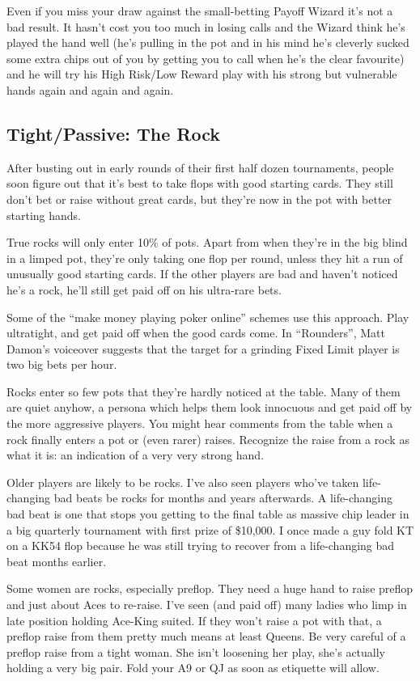 Even if you miss your draw against the small-betting Payoff Wizard
it's not a bad result. It hasn't cost you too much in losing calls and
the Wizard think he's played the hand well (he's pulling in the pot and
in his mind he's cleverly sucked some extra chips out of you by
getting you to call when he's the clear favourite)
and he will try his High Risk/Low Reward play with his strong but
vulnerable hands again and again and again.

\subsection{Tight/Passive: The Rock}

After busting out in early rounds of their first half dozen
tournaments, people soon figure out that it's best to take flops
with good starting cards. They still don't bet or raise without
great cards, but they're now in the pot with better starting hands.

True rocks will only enter 10\% of pots. Apart from when they're
in the big blind in a limped pot, they're only taking one
flop per round, unless they hit a run of unusually good starting
cards. If the other players are bad and haven't noticed
he's a rock, he'll still get paid off on his ultra-rare bets.

Some of the ``make money playing poker online'' schemes use this
approach. Play ultratight, and get paid off when the good cards
come. In ``Rounders'', Matt Damon's voiceover suggests that
the target for a grinding Fixed Limit player is two big bets per
hour.

Rocks enter so few pots that they're hardly noticed
at the table. Many of them are quiet anyhow,
a persona which helps them look innocuous and get paid off by the
more aggressive players. You might hear comments from the table
when a rock finally enters a pot or (even rarer) raises. Recognize
the raise from a rock as what it is: an indication of a very very
strong hand.

Older players are likely to be rocks. I've also seen players who've
taken life-changing bad beats be rocks for months and years
afterwards. A life-changing bad beat is one that stops you getting to
the final table as massive chip leader in a big quarterly tournament
with first prize of \$10,000. I once made a guy fold KT on a KK54 flop
because he was still trying to recover from a life-changing bad beat
months earlier.

Some women are rocks, especially preflop. They
need a huge hand to raise preflop and just about Aces to
re-raise. I've seen (and paid off) many ladies who limp in late
position holding Ace-King suited. If they won't raise a pot with that,
a preflop raise from them pretty much means at least Queens. Be very
careful of a preflop raise from a tight woman. She isn't
loosening her play, she's actually holding a very
big pair. Fold your A9 or QJ as soon as etiquette will allow.

